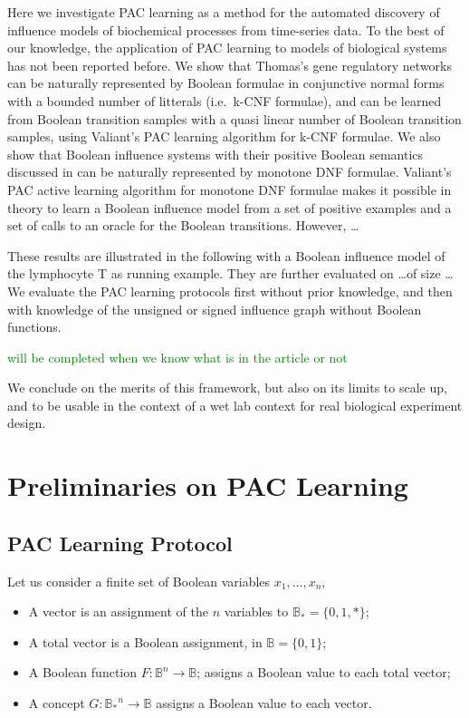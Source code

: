 \documentclass{llncs}
\newcommand{\sylvain}[1]{\textcolor{green}{#1}}
\begin{document}
Here we investigate PAC learning as a method for the automated discovery of influence models of biochemical processes from time-series data. 
To the best of our knowledge, 
the application of PAC learning to models of biological systems has not been reported before.
We show that Thomas's gene regulatory networks \cite{Thomas91jtb,Thomas73jtb} can be naturally represented by 
Boolean formulae in conjunctive normal forms with a bounded number of litterals (i.e.~k-CNF formulae),
and can be learned from Boolean transition samples with a quasi linear number of Boolean transition samples, using Valiant's PAC learning algorithm for k-CNF formulae.
We also show that Boolean influence systems with their positive Boolean semantics discussed in \cite{FMRS16cmsb}
can be naturally represented by monotone DNF formulae.
Valiant's PAC active learning algorithm for monotone DNF formulae makes it possible in theory 
to learn a Boolean influence model from a set of positive examples and a set of calls to an oracle for the Boolean transitions.
However, \dots

These results are illustrated in the following with a Boolean influence model of the lymphocyte T as running example.
They are further evaluated on \dots of size \dots
We evaluate the PAC learning protocols first without prior knowledge, and then with knowledge of the unsigned or signed influence graph without Boolean functions.

\sylvain{will be completed when we know what is in the article or not}

We conclude on the merits of this framework, but also on its limits to scale up,
and to be usable in the context of a wet lab context for real biological experiment design.


\section{Preliminaries on PAC Learning}\label{pac}

\subsection{PAC Learning Protocol}


Let us consider a finite set of Boolean variables $x_1,\ldots,x_n$,
\begin{itemize}
	\item A vector is an assignment of the $n$ variables to $\mathbb{B}_* = \{0,1,*\}$;
	\item A total vector is a Boolean assignment, in $\mathbb{B} = \{0,1\}$;
	\item A Boolean function $F:{\mathbb{B}}^n \rightarrow \mathbb{B}$;
	assigns a Boolean value to each total vector;
\item A concept $G:{\mathbb{B}_*}^n \rightarrow \mathbb{B}$
	assigns a Boolean value to each vector.
\end{itemize}
\end{document}
